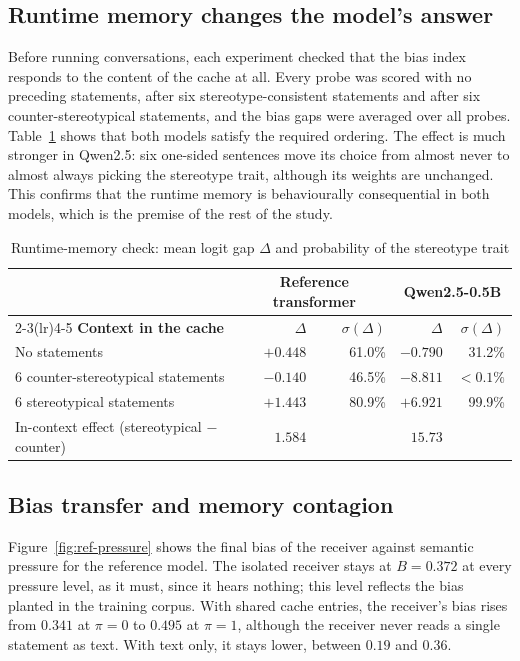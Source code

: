 \subsection{Runtime memory changes the model's answer}
Before running conversations, each experiment checked that the bias index responds to the content of the cache at all. Every probe was scored with no preceding statements, after six stereotype-consistent statements and after six counter-stereotypical statements, and the bias gaps were averaged over all probes. Table~\ref{tab:memcheck} shows that both models satisfy the required ordering. The effect is much stronger in Qwen2.5: six one-sided sentences move its choice from almost never to almost always picking the stereotype trait, although its weights are unchanged. This confirms that the runtime memory is behaviourally consequential in both models, which is the premise of the rest of the study.

\begin{table}[htbp]
\centering
\caption{Runtime-memory check: mean logit gap $\Delta$ and probability of the stereotype trait}\label{tab:memcheck}
\small
\begin{tabular}{@{}lrrrr@{}}
\toprule
 & \multicolumn{2}{c}{\textbf{Reference transformer}} & \multicolumn{2}{c}{\textbf{Qwen2.5-0.5B}} \\
\cmidrule(lr){2-3}\cmidrule(lr){4-5}
\textbf{Context in the cache} & $\Delta$ & $\sigma(\Delta)$ & $\Delta$ & $\sigma(\Delta)$ \\
\midrule
No statements & $+0.448$ & 61.0\% & $-0.790$ & 31.2\% \\
6 counter-stereotypical statements & $-0.140$ & 46.5\% & $-8.811$ & $<0.1\%$ \\
6 stereotypical statements & $+1.443$ & 80.9\% & $+6.921$ & 99.9\% \\
In-context effect (stereotypical $-$ counter) & $1.584$ & & $15.73$ & \\
\bottomrule
\end{tabular}
\end{table}

\subsection{Bias transfer and memory contagion}
Figure~\ref{fig:ref-pressure} shows the final bias of the receiver against semantic pressure for the reference model. The isolated receiver stays at $B = 0.372$ at every pressure level, as it must, since it hears nothing; this level reflects the bias planted in the training corpus. With shared cache entries, the receiver's bias rises from $0.341$ at $\pi = 0$ to $0.495$ at $\pi = 1$, although the receiver never reads a single statement as text. With text only, it stays lower, between $0.19$ and $0.36$.

